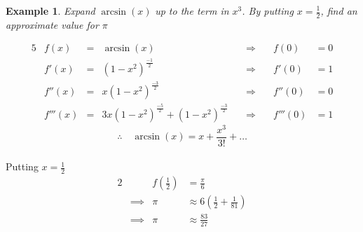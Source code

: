 \documentclass[12pt, a4paper]{report}
\theoremstyle{definition}
\newtheorem{example}{Example}
\begin{document}
	\begin{example}
		\emph{Expand} $\arcsin(x)$ \emph{up to the term in $x^3$. By putting $x=\frac{1}{2}$, find an approximate value for $\pi$}
	\end{example}
	
	\begin{alignat*}{5}
		& f(x)    & = & \arcsin(x)      \quad                                   & \Rightarrow  \quad & f(0)    & = 0 \\
		& f'(x)   & = & (1-x^2)^{\frac{-1}{2}} \quad                            & \Rightarrow  \quad & f'(0)   & = 1 \\
		& f''(x)  & = & x(1-x^2)^{\frac{-3}{2}}\quad                            & \Rightarrow \quad  & f''(0)  & = 0 \\
		& f'''(x) & = & 3x(1-x^2)^{\frac{-5}{2}} + (1-x^2)^{\frac{-3}{2}} \quad & \Rightarrow  \quad & f'''(0) & = 1 
	\end{alignat*}
	$$\therefore \quad \arcsin(x)   = x + \frac{x^3}{3!} + \ldots $$\\
	Putting $x = \frac{1}{2}$\\
	\begin{alignat*}{2}
		&          & f\left(\frac{1}{2}\right) & = \frac{\pi}{6}                                \\
		& \implies & \pi                       & \approx 6\left(\frac{1}{2}+\frac{1}{81}\right) \\
		& \implies & \pi                       & \approx \frac{83}{27}                          
	\end{alignat*}
	\newpage
\end{document}
